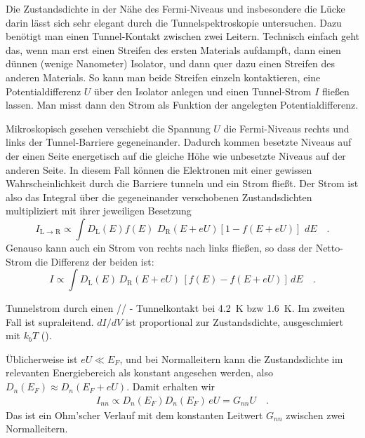 Die Zustandsdichte in der Nähe des Fermi-Niveaus und insbesondere die Lücke darin lässt sich sehr elegant durch die Tunnelspektroskopie untersuchen. Dazu benötigt man einen Tunnel-Kontakt zwischen zwei Leitern. Technisch einfach geht das, wenn man erst einen Streifen des ersten Materials aufdampft, dann einen dünnen (wenige Nanometer) Isolator, und dann quer dazu einen Streifen  des anderen Materials. So kann man beide Streifen einzeln kontaktieren, eine Potentialdifferenz $U$ über den Isolator anlegen und einen Tunnel-Strom $I$ fließen lassen. Man misst dann den Strom als Funktion der angelegten Potentialdifferenz.

Mikroskopisch gesehen verschiebt die Spannung $U$ die Fermi-Niveaus rechts und links der Tunnel-Barriere gegeneinander. Dadurch kommen besetzte Niveaus auf der einen Seite energetisch auf die gleiche Höhe wie unbesetzte Niveaus auf der anderen Seite. In diesem Fall können die Elektronen mit einer gewissen Wahrscheinlichkeit durch die Barriere tunneln und ein Strom fließt. Der Strom ist also das Integral über die gegeneinander verschobenen Zustandsdichten multipliziert mit ihrer jeweiligen Besetzung
\begin{equation}
    I_\text{L $\rightarrow$ R} \propto \int D_\text{L}(E) f(E) \, \, D_\text{R}(E + e U) [1 - f(E + e U)] \, \, dE \quad .
\end{equation}
Genauso kann auch ein Strom von rechts nach links fließen, so dass der Netto-Strom die Differenz der beiden ist:
\begin{equation}
    I \propto \int D_\text{L}(E) \, D_\text{R}(E + e U)  \, [f(E) - f(E + e U)] \, dE \quad .
\end{equation}

\begin{marginfigure}
    \caption{Tunnelstrom durch einen // - Tunnelkontakt bei 4.2~K bzw 1.6~K. Im zweiten Fall ist  supraleitend. $dI/dV$ ist proportional zur Zustandsdichte, ausgeschmiert mit $k_b T$
(\cite{Giaever1960}).}
\end{marginfigure}
  

Üblicherweise ist $eU \ll E_F$, und bei Normalleitern kann die Zustandsdichte  im relevanten Energiebereich als konstant angesehen werden, also $D_{n}(E_F)  \approx  D_{n}(E_F + e U)$. Damit erhalten wir
\begin{eqnarray}
    I_{nn} \propto D_{n}(E_F)  D_{n}(E_F) \, e U = G_{nn} U \quad .
\end{eqnarray}
Das ist ein Ohm'scher Verlauf mit dem konstanten Leitwert $G_{nn}$ zwischen zwei Normalleitern.

